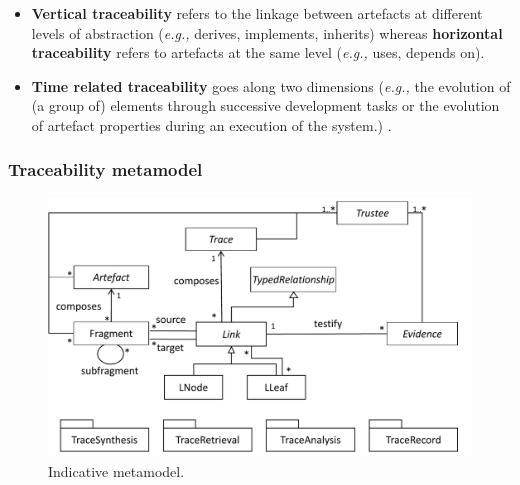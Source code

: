 \begin{itemize}
	\item \textbf{Vertical traceability} refers to the linkage between artefacts at different levels of abstraction (\textit{e.g.,} derives, implements, inherits) whereas \textbf{horizontal traceability} refers to artefacts at the same level (\textit{e.g.,} uses, depends on). 
	
	\item \textbf{Time related traceability} goes along two dimensions (\textit{e.g.,} the evolution of (a group of) elements through successive development tasks or the evolution of artefact properties during an execution of the system.) \cite{yu2012-maintainging-invariant-traceability}.
\end{itemize}



\subsubsection{Traceability metamodel}
\begin{figure}[h]
	\centering
	\includegraphics[width=.6\linewidth]{images/metamodel}
	\caption{Indicative metamodel.}
	\label{fig:metamodel}
\end{figure}

